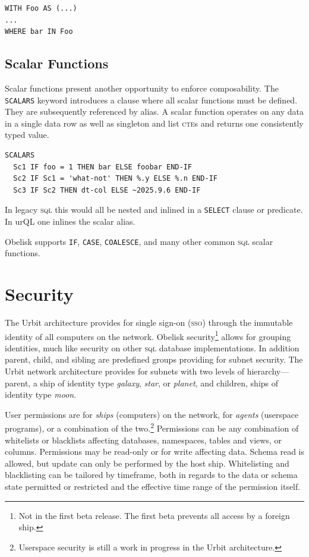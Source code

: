 \documentclass[twoside]{article}
\begin{document}
\begin{lstlisting}[style=listingcode_sql]
WITH Foo AS (...)
...
WHERE bar IN Foo
\end{lstlisting}

\subsection{Scalar Functions}

Scalar functions present another opportunity to enforce composability. The \lstinline[style=inlinecode]{SCALARS} keyword introduces a clause where all scalar functions must be defined. They are subsequently referenced by alias. A scalar function operates on any data in a single data row as well as singleton and list \textsc{cte}s and returns one consistently typed value.

\begin{lstlisting}[style=listingcode_sql]
SCALARS
  Sc1 IF foo = 1 THEN bar ELSE foobar END-IF
  Sc2 IF Sc1 = 'what-not' THEN %.y ELSE %.n END-IF
  Sc3 IF Sc2 THEN dt-col ELSE ~2025.9.6 END-IF
\end{lstlisting}

\noindent
In legacy \textsc{sql} this would all be nested and inlined in a \lstinline[style=inlinecode]{SELECT} clause or predicate. In urQL one inlines the scalar alias.

Obelisk supports \lstinline[style=inlinecode]{IF}, \lstinline[style=inlinecode]{CASE}, \lstinline[style=inlinecode]{COALESCE}, and many other common \textsc{sql} scalar functions.

\section{Security}

The Urbit architecture provides for single sign-on (\textsc{sso}) through the immutable identity of all computers on the network. Obelisk security\footnote{Not in the first beta release. The first beta prevents all access by a foreign ship.} allows for grouping identities, much like security on other \textsc{sql} database implementations. In addition parent, child, and sibling are predefined groups providing for subnet security. The Urbit network architecture provides for subnets with two levels of hierarchy---parent, a ship of identity type \emph{galaxy}, \emph{star}, or \emph{planet}, and children, ships of identity type \emph{moon}.

User permissions are for \emph{ships} (computers) on the network, for \emph{agents} (userspace programs), or a combination of the two.\footnote{Userspace security is still a work in progress in the Urbit architecture.} Permissions can be any combination of whitelists or blacklists affecting databases, namespaces, tables and views, or columns. Permissions may be read-only or for write affecting data. Schema read is allowed, but update can only be performed by the host ship. Whitelisting and blacklisting can be tailored by timeframe, both in regards to the data or schema state permitted or restricted and the effective time range of the permission itself.
\end{document}
